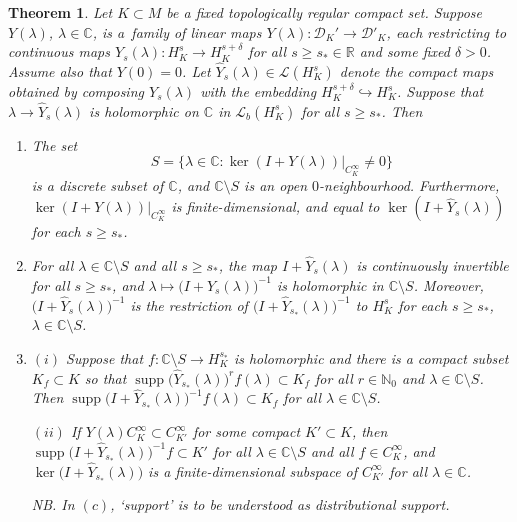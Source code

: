 \documentclass[pdftex]{sigma}
\numberwithin{equation}{section}
\newtheorem{Theorem}{Theorem}[section]
\newcommand{\CC}{{\mathbb C}}
\newcommand{\RR}{{\mathbb R}}
\newcommand{\NN}{{\mathbb N}}
\newcommand{\DD}{{\mathscr D}}
\newcommand{\LL}{{\mathcal L}}
\DeclareMathOperator{\supp}{supp}
\begin{document}
 \begin{Theorem}\label{thm:Sobolevinversion}
 	Let $K\subset M$ be a fixed topologically regular compact set. Suppose
 	$Y(\lambda)$, $\lambda\in\CC$, is a~family of linear maps
 	$Y(\lambda)\colon\DD_K'\to\DD'_K$, each restricting to continuous maps $Y_s(\lambda)\colon H^s_K\to H^{s+\delta}_K$ for all $s\ge s_*\in\RR$ and some fixed $\delta>0$. Assume also that $Y(0)=0$.
 	Let $\hat{Y}_s(\lambda)\in\LL(H^s_K)$ denote the compact maps obtained by composing $Y_s(\lambda)$ with the embedding $H^{s+\delta}_K\hookrightarrow H^s_K$. Suppose that $\lambda \to \hat{Y}_s(\lambda)$ is holomorphic on $\CC$ in $\LL_b(H^s_K)$ for all $s\ge s_*$. Then
 	\begin{enumerate}\itemsep=0pt
 		\item[$(a)$] The set
 		\begin{equation}\label{eq:Sdef}
 			S=\big\{\lambda\in\CC\colon \ker (I+ Y(\lambda))|_{C^\infty_K}\neq 0\big\}
 		\end{equation}
 		is a discrete subset of $\CC$, and $\CC\setminus S$ is an open $0$-neighbourhood. Furthermore, $\ker (I+ Y(\lambda))|_{C^\infty_K}$ is finite-dimensional, and equal to
 		$\ker (I+ \hat{Y}_s(\lambda))$ for each $s\ge s_*$.
 		
 		\item[$(b)$] For all $\lambda\in \CC\setminus S$ and all $s\ge s_*$, the map $I+ \hat{Y}_{s}(\lambda)$ is continuously invertible for all $s\ge s_*$, and $\lambda\mapsto \big(I+ \hat{Y}_{s}(\lambda)\big)^{-1}$ is holomorphic in $\CC\setminus S$. Moreover,
 		$\big(I+ \hat{Y}_{s}(\lambda)\big)^{-1}$ is the restriction of $\big(I+ \hat{Y}_{s_*}(\lambda)\big)^{-1}$ to $H^s_K$ for each $s\ge s_*$, $\lambda\in\CC\setminus S$.
 		
 		\item[$(c)$] $(i)$ Suppose that $f\colon \CC\setminus S\to H^{s_*}_K$ is holomorphic and
 		there is a compact subset ${K_f\subset K}$ so that $\supp \big(\hat{Y}_{s_*}(\lambda)\big)^r f(\lambda)\subset K_f$ for all $r\in\NN_0$ and $\lambda\in \CC\setminus S$. Then $\supp \big(I+\hat{Y}_{s_*}(\lambda)\big)^{-1}f(\lambda)\subset K_f$ for all $\lambda\in \CC\setminus S$.
 		
 		$(ii)$ If $Y(\lambda)C^\infty_K\subset C^\infty_{K'}$ for some compact $K'\subset K$, then
 		$\supp \big(I+ \hat{Y}_{s_*}(\lambda)\big)^{-1}f\subset K'$ for all $\lambda\in \CC\setminus S$ and all $f\in C^\infty_K$, and
 		$\ker \big(I+ \hat{Y}_{s_*}(\lambda)\big)$ is a finite-dimensional subspace of
 		$C^\infty_{K'}$ for all $\lambda\in\CC$.
 		
 		NB. In $(c)$, `support' is to be understood as distributional support.
 	\end{enumerate}
 \end{Theorem}
\end{document}
